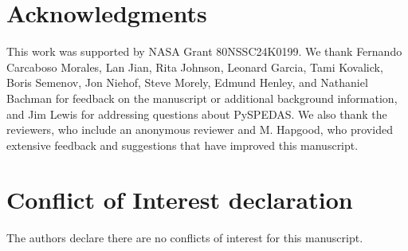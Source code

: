 \documentclass[draft]{agujournal2019}
\begin{document}
\section*{Acknowledgments}

This work was supported by NASA Grant 80NSSC24K0199. We thank Fernando Carcaboso Morales, Lan Jian, Rita Johnson, Leonard Garcia, Tami Kovalick, Boris Semenov, Jon Niehof, Steve Morely, Edmund Henley, and Nathaniel Bachman for feedback on the manuscript or additional background information, and Jim Lewis for addressing questions about PySPEDAS. We also thank the reviewers, who include an anonymous reviewer and M. Hapgood, who provided extensive feedback and suggestions that have improved this manuscript.

\section*{Conflict of Interest declaration}

\noindent
The authors declare there are no conflicts of interest for this manuscript.

{\raggedright }
\end{document}
